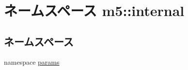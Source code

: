 \hypertarget{namespacem5_1_1internal}{
\section{ネームスペース m5::internal}
\label{namespacem5_1_1internal}
}
\subsection*{ネームスペース}
\begin{DoxyCompactItemize}
\item 
namespace \hyperlink{namespacem5_1_1internal_1_1params}{params}
\end{DoxyCompactItemize}
